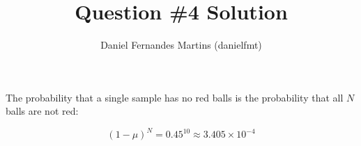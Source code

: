 \documentclass{article}
\author{Daniel Fernandes Martins (danielfmt)}
\title{Question \#4 Solution}
\begin{document}
\maketitle

The probability that a single sample has no red balls is the probability that
all $N$ balls are not red:

\begin{equation*}
(1-\mu)^N = 0.45^{10} \approx 3.405 \times 10^{-4}
\end{equation*}
\end{document}
